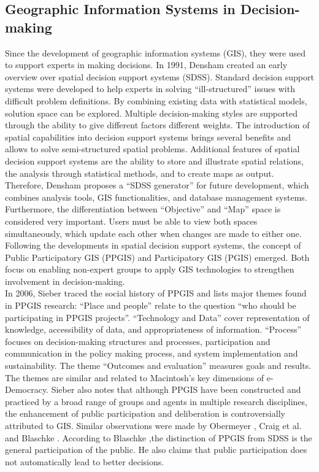 \subsection{Geographic Information Systems in Decision-making}
\label{subchap:gis_stuff}
Since the development of geographic information systems (GIS), they were used to support experts in making decisions. In 1991, Densham \cite{densham_sdss} created an early overview over spatial decision support systems (SDSS). Standard decision support systems were developed to help experts in solving ``ill-structured'' issues with difficult problem definitions. By combining existing data with statistical models, solution space can be explored. Multiple decision-making styles are supported through the ability to give different factors different weights. The introduction of spatial capabilities into decision support systems brings several benefits and allows to solve semi-structured spatial problems. Additional features of spatial decision support systems are the ability to store and illustrate spatial relations, the analysis through statistical methods, and to create maps as output. Therefore, Densham proposes a ``SDSS generator'' for future development, which combines analysis tools, GIS functionalities, and database management systems. Furthermore, the differentiation between ``Objective'' and ``Map'' space is considered very important. Users must be able to view both spaces simultaneously, which update each other when changes are made to either one.\\
Following the developments in spatial decision support systems, the concept of Public Participatory GIS (PPGIS) and Participatory GIS (PGIS) emerged. Both focus on enabling non-expert groups to apply GIS technologies to strengthen involvement in decision-making.\\
In 2006, Sieber \cite{Sieber2006_PublicParticipationGIS} traced the social history of PPGIS and lists major themes found in PPGIS research: ``Place and people'' relate to the question ``who should be participating in PPGIS projects''. ``Technology and Data'' cover representation of knowledge, accessibility of data, and appropriateness of information. ``Process'' focuses on decision-making structures and processes, participation and communication in the policy making process, and system implementation and sustainability. The  theme ``Outcomes and evaluation'' measures goals and results. The themes  are similar and related to Macintosh's \cite{Macintosh2004_eParticipation_characterization} key dimensions of e-Democracy. Sieber also notes that although PPGIS have been constructed and practiced by a broad range of groups and agents in multiple research disciplines, the enhancement of public participation and deliberation is controversially attributed to GIS. Similar observations were made by Obermeyer \cite{obermeyer1998evolution}, Craig et al. \cite{Weiner2002_Participation_and_GIS_eigentlich_Craig} and Blaschke \cite{Blaschke2004_PGIS_critically_revised}. According to Blaschke ,the distinction of PPGIS from SDSS is the general participation of the public. He also claims that public participation does not automatically lead to better decisions.\\
